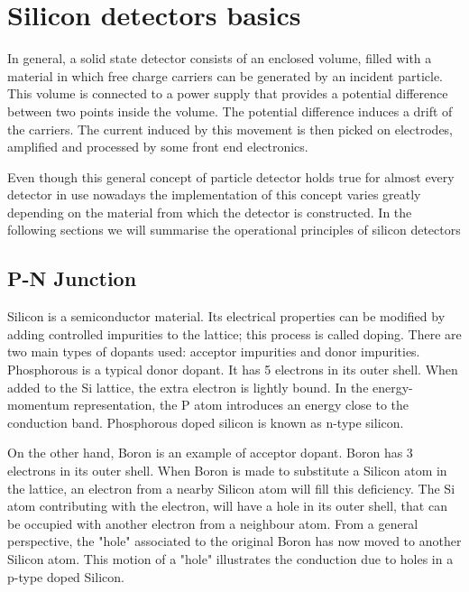 \chapter{Silicon detectors basics} %
\label{chap:detector}

In general, a solid state detector consists of an enclosed volume, filled with a material in
which free charge carriers can be generated by an incident particle. This volume
is connected to a power supply that provides a  potential difference between two
points inside the volume. The potential difference induces a drift of the
carriers. The current induced by this movement is then picked on electrodes,
amplified and processed by some front end electronics.

Even though this general concept of particle detector holds true for almost
every detector in use nowadays the implementation of this concept varies greatly
depending on the material from which the detector is constructed. In the
following sections we will summarise the operational principles of silicon
detectors

\section{P-N Junction}

Silicon is a semiconductor material. Its electrical properties can be modified
by adding controlled impurities to the lattice; this process is called doping.
There are two main types of dopants used: acceptor impurities and donor
impurities. Phosphorous is a typical donor dopant. It has 5 electrons in its
outer shell. When added to the Si lattice, the extra electron is lightly bound.
In the energy-momentum representation, the P atom introduces an energy close to
the conduction band. Phosphorous doped silicon is known as n-type silicon. 

On the other hand, Boron is an example of acceptor dopant. Boron has 3 electrons
in its outer shell. When Boron is made to substitute a Silicon atom in the
lattice, an electron from a nearby Silicon atom will fill this deficiency. The
Si atom contributing with the electron, will have a hole in its outer shell,
that can be occupied with another electron from a neighbour atom. From a general
perspective, the "hole" associated to the original Boron has now moved to
another Silicon atom. This motion of a "hole" illustrates the conduction due to
holes in a p-type doped Silicon.

